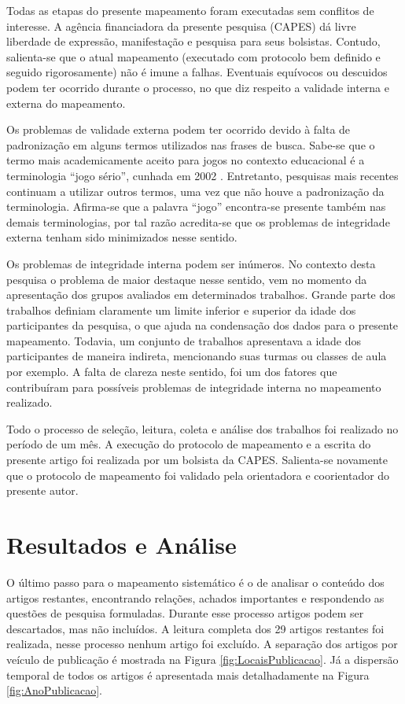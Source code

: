 \documentclass[12pt]{article}
\begin{document}
Todas as etapas do presente mapeamento foram executadas sem conflitos de interesse. A agência financiadora da presente pesquisa (CAPES) dá livre liberdade de expressão, manifestação e pesquisa para seus bolsistas. Contudo, salienta-se que o atual mapeamento (executado com protocolo bem definido e seguido rigorosamente) não é imune a falhas. Eventuais equívocos ou descuidos podem ter ocorrido durante o processo, no que diz respeito a validade interna e externa do mapeamento. 

Os problemas de validade externa podem ter ocorrido devido à falta de padronização em alguns termos utilizados nas frases de busca. Sabe-se que o termo mais academicamente aceito para jogos no contexto educacional é a terminologia ``jogo sério'', cunhada em 2002 \cite{djaouti2011origins}. Entretanto, pesquisas mais recentes continuam a utilizar outros termos, uma vez que não houve a padronização da terminologia. Afirma-se que a palavra ``jogo'' encontra-se presente também nas demais terminologias, por tal razão acredita-se que os problemas de integridade externa tenham sido minimizados nesse sentido. 

Os problemas de integridade interna podem ser inúmeros. No contexto desta pesquisa o problema de maior destaque nesse sentido, vem no momento da apresentação dos grupos avaliados em determinados trabalhos. Grande parte dos trabalhos definiam claramente um limite inferior e superior da idade dos participantes da pesquisa, o que ajuda na condensação dos dados para o presente mapeamento. Todavia, um conjunto de trabalhos apresentava a idade dos participantes de maneira indireta, mencionando suas turmas ou classes de aula por exemplo. A falta de clareza neste sentido, foi um dos fatores que contribuíram para possíveis problemas de integridade interna no mapeamento realizado. 

Todo o processo de seleção, leitura, coleta e análise dos trabalhos foi realizado no período de um mês. A execução do protocolo de mapeamento e a escrita do presente artigo foi realizada por um bolsista da CAPES. Salienta-se novamente que o protocolo de mapeamento foi validado pela orientadora e coorientador do presente autor. 

\section{Resultados e Análise}\label{secao:resultados}

O último passo para o mapeamento sistemático é o de analisar o conteúdo dos artigos restantes, encontrando relações, achados importantes e respondendo as questões de pesquisa formuladas. Durante esse processo artigos podem ser descartados, mas não incluídos. A leitura completa dos 29 artigos restantes foi realizada, nesse processo nenhum artigo foi excluído. A separação dos artigos por veículo de publicação é mostrada na Figura \ref{fig:LocaisPublicacao}. Já a dispersão temporal de todos os artigos é apresentada mais detalhadamente na Figura \ref{fig:AnoPublicacao}.
\end{document}
